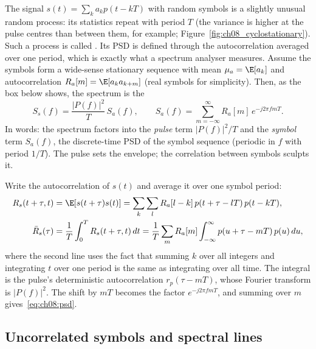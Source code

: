 The signal $s(t)=\sum_k a_kp(t-kT)$ with random symbols is a slightly unusual random process:
its statistics repeat with period $T$ (the variance is higher at the pulse centres than between
them, for example; Figure~\ref{fig:ch08_cyclostationary}). Such a process is called
. Its PSD is defined through
the autocorrelation averaged over one period, which is exactly what a spectrum analyser
measures. Assume the symbols form a wide-sense stationary sequence with mean
$\mu_a=\E[a_k]$ and autocorrelation $R_a[m]=\E[a_k a_{k+m}]$ (real symbols for simplicity).
Then, as the box below shows, the spectrum is the 
\begin{equation}
\boxed{\;S_s(f)=\frac{|P(f)|^2}{T}\,S_a(f),\qquad S_a(f)=\sum_{m=-\infty}^{\infty}R_a[m]\,e^{-j2\pi fmT}.\;}
\label{eq:ch08:psd}
\end{equation}
In words: the spectrum factors into the \emph{pulse} term $|P(f)|^2/T$ and the \emph{symbol}
term $S_a(f)$, the discrete-time PSD of the symbol sequence (periodic in $f$ with period
$1/T$). The pulse sets the envelope; the correlation between symbols sculpts it.

\begin{deeper}
Write the autocorrelation of $s(t)$ and average it over one symbol period:
\begin{align}
R_s(t+\tau,t)&=\E[s(t+\tau)s(t)]=\sum_k\sum_l R_a[l-k]\,p(t+\tau-lT)\,p(t-kT),\notag\\
\bar R_s(\tau)&=\frac1T\int_0^T R_s(t+\tau,t)\,dt
=\frac1T\sum_m R_a[m]\int_{-\infty}^{\infty}p(u+\tau-mT)\,p(u)\,du,
\end{align}
where the second line uses the fact that summing $k$ over all integers and integrating $t$
over one period is the same as integrating over all time. The integral is the pulse's
deterministic autocorrelation $r_p(\tau-mT)$, whose Fourier transform is $|P(f)|^2$. The shift
by $mT$ becomes the factor $e^{-j2\pi fmT}$, and summing over $m$ gives~\eqref{eq:ch08:psd}.
\end{deeper}


\subsection{Uncorrelated symbols and spectral lines}

